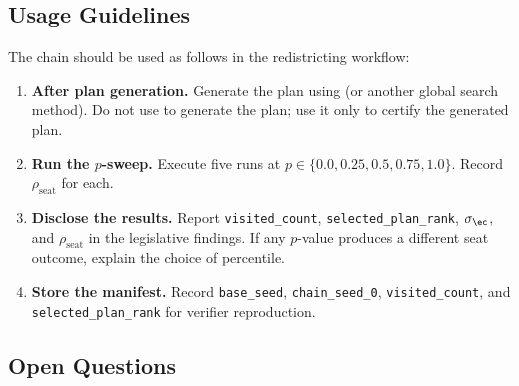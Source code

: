 \subsection{Usage Guidelines}

The \flip{} chain should be used as follows in the redistricting workflow:

\begin{enumerate}
  \item \textbf{After plan generation.} Generate the plan using \cs{} (or
        another global search method). Do not use \flip{} to generate the
        plan; use it only to certify the generated plan.
  \item \textbf{Run the $p$-sweep.} Execute five \flip{} runs at
        $p \in \{0.0, 0.25, 0.5, 0.75, 1.0\}$.
        Record $\rho_{\mathrm{seat}}$ for each.
  \item \textbf{Disclose the results.} Report \texttt{visited\_count},
        \texttt{selected\_plan\_rank}, $\sigma_{\ec}$, and
        $\rho_{\mathrm{seat}}$ in the legislative findings.
        If any $p$-value produces a different seat outcome, explain the
        choice of percentile.
  \item \textbf{Store the manifest.} Record \texttt{base\_seed},
        \texttt{chain\_seed\_0}, \texttt{visited\_count}, and
        \texttt{selected\_plan\_rank} for verifier reproduction.
\end{enumerate}

\subsection{Open Questions}

